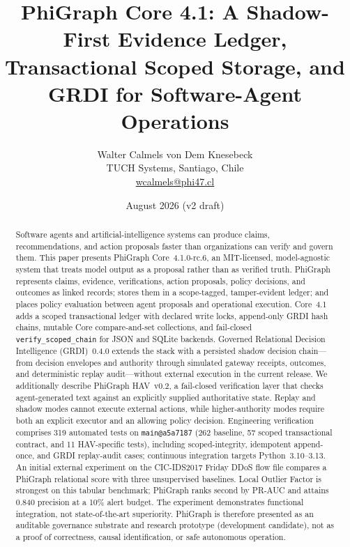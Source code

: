 \documentclass[11pt]{article}
\title{\textbf{PhiGraph Core 4.1: A Shadow-First Evidence Ledger,\\Transactional Scoped Storage, and GRDI for Software-Agent Operations}}
\author{
  Walter Calmels von Dem Knesebeck\\
  TUCH Systems, Santiago, Chile\\
  \href{mailto:wcalmels@phi47.cl}{wcalmels@phi47.cl}
}
\date{August 2026 (v2 draft)}
\begin{document}
\maketitle

\begin{abstract}
Software agents and artificial-intelligence systems can produce claims,
recommendations, and action proposals faster than organizations can verify and
govern them. This paper presents PhiGraph Core~4.1.0-rc.6, an MIT-licensed,
model-agnostic system that treats model output as a proposal rather than as
verified truth. PhiGraph represents claims, evidence, verifications, action
proposals, policy decisions, and outcomes as linked records; stores them in a
scope-tagged, tamper-evident ledger; and places policy evaluation between agent
proposals and operational execution. Core~4.1 adds a scoped transactional
ledger with declared write locks, append-only GRDI hash chains, mutable Core
compare-and-set collections, and fail-closed \texttt{verify\_scoped\_chain}
for JSON and SQLite backends. Governed Relational Decision Intelligence
(GRDI)~0.4.0 extends the stack with a persisted shadow decision chain---from
decision envelopes and authority through simulated gateway receipts, outcomes,
and deterministic replay audit---without external execution in the current
release. We additionally describe PhiGraph HAV~v0.2, a fail-closed verification
layer that checks agent-generated text against an explicitly supplied
authoritative state. Replay and shadow modes cannot execute external actions,
while higher-authority modes require both an explicit executor and an allowing
policy decision. Engineering verification comprises 319 automated tests on
\texttt{main@a5a7187} (262 baseline, 57 scoped transactional contract, and 11
HAV-specific tests), including scoped-integrity, idempotent append-once, and
GRDI replay-audit cases; continuous integration targets Python~3.10--3.13. An
initial external experiment on the CIC-IDS2017 Friday DDoS flow file compares a
PhiGraph relational score with three unsupervised baselines. Local Outlier
Factor is strongest on this tabular benchmark; PhiGraph ranks second by PR-AUC
and attains 0.840 precision at a 10\% alert budget. The experiment
demonstrates functional integration, not state-of-the-art superiority. PhiGraph
is therefore presented as an auditable governance substrate and research
prototype (development candidate), not as a proof of correctness, causal
identification, or safe autonomous operation.
\end{abstract}
\end{document}
